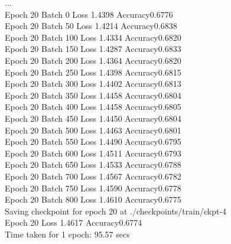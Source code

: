 \begin{tcolorbox}[myoutputstyle]
...\\
Epoch 20 Batch 0 Loss 1.4398 Accuracy0.6776\\
Epoch 20 Batch 50 Loss 1.4214 Accuracy0.6838\\
Epoch 20 Batch 100 Loss 1.4334 Accuracy0.6820\\
Epoch 20 Batch 150 Loss 1.4287 Accuracy0.6833\\
Epoch 20 Batch 200 Loss 1.4364 Accuracy0.6820\\
Epoch 20 Batch 250 Loss 1.4398 Accuracy0.6815\\
Epoch 20 Batch 300 Loss 1.4402 Accuracy0.6813\\
Epoch 20 Batch 350 Loss 1.4458 Accuracy0.6804\\
Epoch 20 Batch 400 Loss 1.4458 Accuracy0.6805\\
Epoch 20 Batch 450 Loss 1.4450 Accuracy0.6804\\
Epoch 20 Batch 500 Loss 1.4463 Accuracy0.6801\\
Epoch 20 Batch 550 Loss 1.4490 Accuracy0.6795\\
Epoch 20 Batch 600 Loss 1.4511 Accuracy0.6793\\
Epoch 20 Batch 650 Loss 1.4533 Accuracy0.6788\\
Epoch 20 Batch 700 Loss 1.4567 Accuracy0.6782\\
Epoch 20 Batch 750 Loss 1.4590 Accuracy0.6778\\
Epoch 20 Batch 800 Loss 1.4610 Accuracy0.6775\\
Saving checkpoint for epoch 20 at ./checkpoints/train/ckpt-4\\
Epoch 20 Loss 1.4617 Accuracy0.6774\\
Time taken for 1 epoch: 95.57 secs
\end{tcolorbox}


